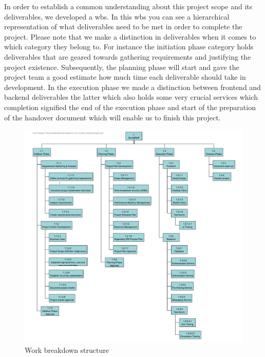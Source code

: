 In order to establish a common understanding about this project scope and its deliverables, we developed a \ac{wbs}.
In this \ac{wbs} you can see a hierarchical representation of what deliverables need to be met in order to complete
the project.
Please note that we make a distinction in deliverables when it comes to which category they belong to.
For instance the initiation phase category holds deliverables that are geared towards gathering requirements and
justifying the project existence.
Subsequently, the planning phase will start and gave the project team a good estimate how much time each deliverable
should take in development.
In the execution phase we made a distinction between frontend and backend deliverables the latter which also holds
some very crucial services which completion signified the end of the execution phase and start of the preparation of
the handover document which will enable us to finish this project.

\begin{figure}[H]
    \centering
    \includegraphics[width=1.0\textwidth]{./images/wbs}
    \caption{Work breakdown structure}
    \label{fig:figure40}
\end{figure}

